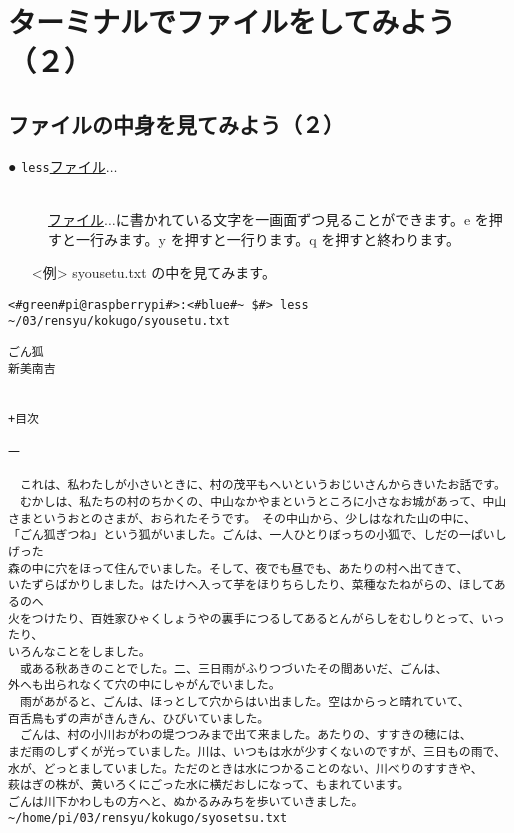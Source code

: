 \newpage
\section{ターミナルでファイルをしてみよう（２）}

\subsection{ファイルの中身を見てみよう（２）}
\begin{description}
\item[● \texttt{less}\textvisiblespace \underline{ファイル}$\ldots$]\mbox{}\\
\underline{ファイル}$\ldots$に書かれている文字を一画面ずつ見ることができます。e を押すと一行みます。y を押すと一行ります。q を押すと終わります。

\end{description}
\begin{itemize}
\item[<例>]syousetu.txt の中を見てみます。
\end{itemize}
\begin{lstlisting}[caption=lessの例, label=less]
<#green#pi@raspberrypi#>:<#blue#~ $#> less ~/03/rensyu/kokugo/syousetu.txt
\end{lstlisting}
\begin{lstlisting}[caption=lessの結果, label=less-result]
ごん狐
新美南吉


+目次

一

　これは、私わたしが小さいときに、村の茂平もへいというおじいさんからきいたお話です。
　むかしは、私たちの村のちかくの、中山なかやまというところに小さなお城があって、中山
さまというおとのさまが、おられたそうです。　その中山から、少しはなれた山の中に、
「ごん狐ぎつね」という狐がいました。ごんは、一人ひとりぼっちの小狐で、しだの一ぱいしげった
森の中に穴をほって住んでいました。そして、夜でも昼でも、あたりの村へ出てきて、
いたずらばかりしました。はたけへ入って芋をほりちらしたり、菜種なたねがらの、ほしてあるのへ
火をつけたり、百姓家ひゃくしょうやの裏手につるしてあるとんがらしをむしりとって、いったり、
いろんなことをしました。
　或ある秋あきのことでした。二、三日雨がふりつづいたその間あいだ、ごんは、
外へも出られなくて穴の中にしゃがんでいました。
　雨があがると、ごんは、ほっとして穴からはい出ました。空はからっと晴れていて、
百舌鳥もずの声がきんきん、ひびいていました。
　ごんは、村の小川おがわの堤つつみまで出て来ました。あたりの、すすきの穂には、
まだ雨のしずくが光っていました。川は、いつもは水が少すくないのですが、三日もの雨で、
水が、どっとましていました。ただのときは水につかることのない、川べりのすすきや、
萩はぎの株が、黄いろくにごった水に横だおしになって、もまれています。
ごんは川下かわしもの方へと、ぬかるみみちを歩いていきました。
~/home/pi/03/rensyu/kokugo/syosetsu.txt
\end{lstlisting}

